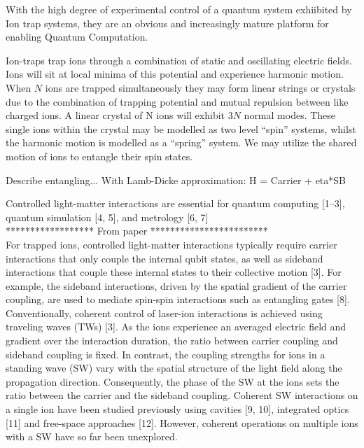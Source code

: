 \documentclass[12pt]{iopart}
\begin{document}
With the high degree of experimental control of a quantum system
exhiibited by Ion trap systems, they are an obvious and increasingly
mature platform for enabling Quantum Computation.

Ion-traps trap ions through a combination of static and oscillating
electric fields. Ions will sit at local minima of this potential and
experience harmonic motion. When $N$ ions are trapped
simultaneously they may form linear strings or crystals due to the
combination of trapping potential and mutual repulsion between
like charged ions. A linear crystal of N ions will exhibit $3N$ normal
modes. These single ions within the crystal may be modelled as two
level ``spin'' systems, whilst the harmonic motion is modelled as a
``spring'' system. We may utilize the shared motion of ions to
entangle their spin states.

Describe entangling...
With Lamb-Dicke approximation:
H = Carrier + eta*SB


    Controlled light-matter interactions are essential for quantum
    computing [1–3], quantum simulation [4, 5], and metrology [6,
      7]\\

    ******************  From paper  ************************\\
    For trapped ions, controlled light-matter interactions typically require
    carrier interactions that only couple the internal qubit states,
    as well as sideband interactions that couple these internal states
    to their collective motion [3]. For example, the sideband
    interactions, driven by the spatial gradient of the carrier
    coupling, are used to mediate spin-spin interactions such as
    entangling gates [8]. Conventionally, coherent control of
    laser-ion interactions is achieved using traveling waves (TWs)
    [3]. As the ions experience an averaged electric field and
    gradient over the interaction duration, the ratio between carrier
    coupling and sideband coupling is fixed. In contrast, the coupling
    strengths for ions in a standing wave (SW) vary with the spatial
    structure of the light field along the propagation
    direction. Consequently, the phase of the SW at the ions sets the
    ratio between the carrier and the sideband coupling. Coherent SW
    interactions on a single ion have been studied previously using
    cavities [9, 10], integrated optics [11] and free-space approaches
    [12]. However, coherent operations on multiple ions with a SW have
    so far been unexplored.\\
\end{document}
